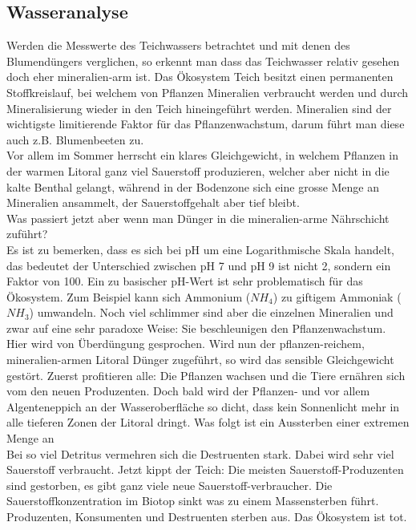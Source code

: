 \documentclass{article}
\begin{document}
    \subsection{Wasseranalyse}
        
        Werden die Messwerte des Teichwassers betrachtet und mit denen des Blumendüngers verglichen, so erkennt man dass das Teichwasser relativ gesehen doch eher mineralien-arm ist. Das Ökosystem Teich besitzt einen permanenten Stoffkreislauf, bei welchem von Pflanzen Mineralien verbraucht werden und durch Mineralisierung wieder in den Teich hineingeführt werden. Mineralien sind der wichtigste limitierende Faktor für das Pflanzenwachstum, darum führt man diese auch z.B. Blumenbeeten zu. \\
        \vspace{5mm}
        Vor allem im Sommer herrscht ein klares Gleichgewicht, in welchem Pflanzen in der warmen Litoral ganz viel Sauerstoff produzieren, welcher aber nicht in die kalte Benthal gelangt, während in der Bodenzone sich eine grosse Menge an Mineralien ansammelt, der Sauerstoffgehalt aber tief bleibt. \\
        \vspace{5mm}
        Was passiert jetzt aber wenn man Dünger in die mineralien-arme Nährschicht zuführt? \\
        Es ist zu bemerken, dass es sich bei pH um eine Logarithmische Skala handelt, das bedeutet der Unterschied zwischen pH 7 und pH 9 ist nicht 2, sondern ein Faktor von 100. Ein zu basischer pH-Wert ist sehr problematisch für das Ökosystem. Zum Beispiel kann sich Ammonium ($NH_4$) zu giftigem Ammoniak ($NH_3$) umwandeln.\cite{Teichpflege} Noch viel schlimmer sind aber die einzelnen Mineralien und zwar auf eine sehr paradoxe Weise: Sie beschleunigen den Pflanzenwachstum. \\
        \vspace{5mm}
        Hier wird von Überdüngung gesprochen. Wird nun der pflanzen-reichem, mineralien-armen Litoral Dünger zugeführt, so wird das sensible Gleichgewicht gestört. Zuerst profitieren alle: Die Pflanzen wachsen und die Tiere ernähren sich vom den neuen Produzenten. Doch bald wird der Pflanzen- und vor allem Algenteneppich an der Wasseroberfläche so dicht, dass kein Sonnenlicht mehr in alle tieferen Zonen der Litoral dringt. Was folgt ist ein Aussterben einer extremen Menge an \\ %
        \vspace{5mm}
        Bei so viel Detritus vermehren sich die Destruenten stark. Dabei wird sehr viel Sauerstoff verbraucht. Jetzt kippt der Teich: Die meisten Sauerstoff-Produzenten sind gestorben, es gibt ganz viele neue Sauerstoff-verbraucher. Die Sauerstoffkonzentration im Biotop sinkt was zu einem Massensterben führt. Produzenten, Konsumenten und Destruenten sterben aus. Das Ökosystem ist tot. \cite{Planet1} \cite{Planet2} \\
\end{document}
